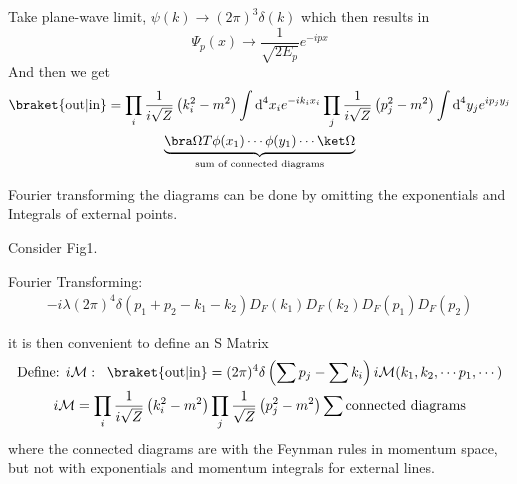 \documentclass[]{scrartcl}
\begin{document}
Take plane-wave limit, $\psi(k) \rightarrow (2\pi)^3\delta(k)$ which then results in
$$
\Psi_{p}(x) \rightarrow \frac{1}{\sqrt{2E_p}}e^{-ipx}
$$
And then we get
\begin{gather}
	\braket{\text{out}|\text{in}} = \prod_i \frac{1}{i\sqrt Z}\left(k_i^2 - m^2\right)\int\text d^4x_i e^{-ik_ix_i} \prod_j\frac{1}{i\sqrt Z}\left(p_j^2 - m^2\right) \int \text d^4y_j e^{ip_jy_j}\\
	\underbrace{\bra\Omega T\phi(x_1)\cdots\phi(y_1)\cdots\ket\Omega}_{\text{sum of connected diagrams}}
\end{gather}

Fourier transforming the diagrams can be done by omitting the exponentials and Integrals of external points.

Consider Fig1.

Fourier Transforming:
\begin{gather}
	-i\lambda (2\pi)^4 \delta(p_1 + p_2 - k_1 - k_2) D_F(k_1)D_F(k_2)D_F(p_1)D_F(p_2)
\end{gather}

it is then convenient to define an S Matrix
\begin{gather}
	\text{Define: } i\mathcal{M}:\;\; \braket{\text{out}|\text{in}} = (2\pi)^4 \delta\left(\sum p_j - \sum k_i\right) i\mathcal{M}(k_1,k_2,\cdots p_1,\cdots)\\
	i\mathcal{M} = \prod_i \frac{1}{i\sqrt Z}\left(k_i^2 - m^2\right) \prod_j \frac{1}{\sqrt Z}\left(p_j^2 -m^2\right)\sum\text{connected diagrams}
\end{gather}
where the connected diagrams are with the Feynman rules in momentum space, but not with exponentials and momentum integrals for external lines.
\end{document}
